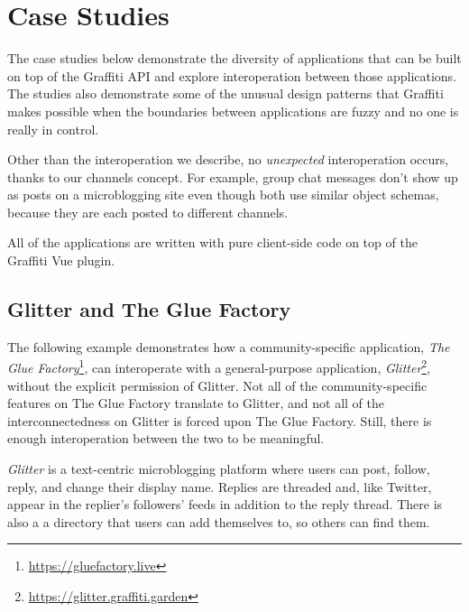 \section{Case Studies}
\label{case-studies}


The case studies below demonstrate the diversity of applications
that can be built on top of the Graffiti API and explore interoperation
between those applications.
The studies also demonstrate some of the unusual design patterns that
Graffiti makes possible when the boundaries between applications
are fuzzy and no one is really in control.

Other than the interoperation we describe, no \emph{unexpected}
interoperation occurs, thanks to our channels concept.
For example, group chat messages don't show up as posts on
a microblogging site even though both use similar object schemas,
because they are each posted to different channels.

All of the applications are written with pure client-side code on
top of the Graffiti Vue plugin.

\subsection{Glitter and The Glue Factory}

The following example demonstrates how a community-specific application,
\emph{The Glue Factory}\footnote{
\url{https://gluefactory.live}
}, can interoperate with a general-purpose application, \emph{Glitter}\footnote{
\url{https://glitter.graffiti.garden}
},
without the explicit permission of Glitter.
Not all of the community-specific features on The Glue Factory
translate to Glitter, and not all of the interconnectedness on Glitter
is forced upon The Glue Factory.
Still, there is enough interoperation between the two to be meaningful.

\emph{Glitter} is a text-centric microblogging platform
where users can post, follow, reply, and change their display name.
Replies are threaded and, like Twitter, appear in the replier's followers' feeds in addition to the reply thread.
There is also a a directory that users can add themselves to,
so others can find them.

